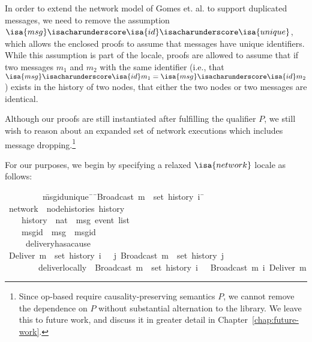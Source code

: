 In order to extend the network model of Gomes et. al. to support duplicated
messages, we need to remove the assumption
$\isa{msg}\isacharunderscore\isa{id}\isacharunderscore\isa{unique}$, which
allows the enclosed proofs to assume that messages have unique identifiers.
While this assumption is part of the locale, proofs are allowed to assume that
if two messages $m_1$ and $m_2$ with the same identifier (i.e., that
$\isa{msg}\isacharunderscore\isa{id} m_1 = \isa{msg}\isacharunderscore\isa{id}
m_2$) exists in the history of two nodes, that either the two nodes or two
messages are identical.

Although our proofs are still instantiated after fulfilling the qualifier $P$,
we still wish to reason about an expanded set of network executions which
includes message dropping.\footnote{Since op-based \CRDTs require
causality-preserving semantics $P$, we cannot remove the dependence on $P$
without substantial alternation to the library. We leave this to future work,
and discuss it in greater detail in Chapter~\ref{chap:future-work}.}

For our purposes, we begin by specifying a relaxed $\isa{network}$ locale as
follows:
\begin{isabelle}
~~~~~~~~\ \=msg{\isacharunderscore}id{\isacharunderscore}unique{\isacharcolon}\ \={\isasymrbrakk}\ \={\isachardoublequoteopen}Broadcast\ m\ {\isasymin}\ set\ {\isacharparenleft}history\ i{\isacharparenright}\ \=\kill
{}\ network\ {\isacharequal}\ node{\isacharunderscore}histories\ history\\
~~~~\>history\ {\isacharcolon}{\isacharcolon}\ {\isachardoublequoteopen}nat\ {\isasymRightarrow}\ {\isacharprime}msg\ event\ list{\isachardoublequoteclose}\ {\isacharplus}\\
~~~~\>msg{\isacharunderscore}id\ {\isacharcolon}{\isacharcolon}\ {\isachardoublequoteopen}{\isacharprime}msg\ {\isasymRightarrow}\ {\isacharprime}msgid{\isachardoublequoteclose}\\
~~~~\ delivery{\isacharunderscore}has{\isacharunderscore}a{\isacharunderscore}cause{\isacharcolon}\\
\>\>{\isasymlbrakk}\ {\isachardoublequoteopen}Deliver\ m\ {\isasymin}\ set\ {\isacharparenleft}history\ i{\isacharparenright}\ \>\>{\isasymrbrakk}\ {\isasymLongrightarrow}\ {\isasymexists}j{\isachardot}\ Broadcast\ m\ {\isasymin}\ set\ {\isacharparenleft}history\ j{\isacharparenright}{\isachardoublequoteclose}\\
~~~~~~~~\>deliver{\isacharunderscore}locally{\isacharcolon}\ \>{\isasymlbrakk}\ \>{\isachardoublequoteopen}Broadcast\ m\ {\isasymin}\ set\ {\isacharparenleft}history\ i{\isacharparenright}\ \>{\isasymrbrakk}\ {\isasymLongrightarrow}\  Broadcast\ m\ {\isasymsqsubset}\isactrlsup i\ Deliver\ m{\isachardoublequoteclose}\\
\end{isabelle}

